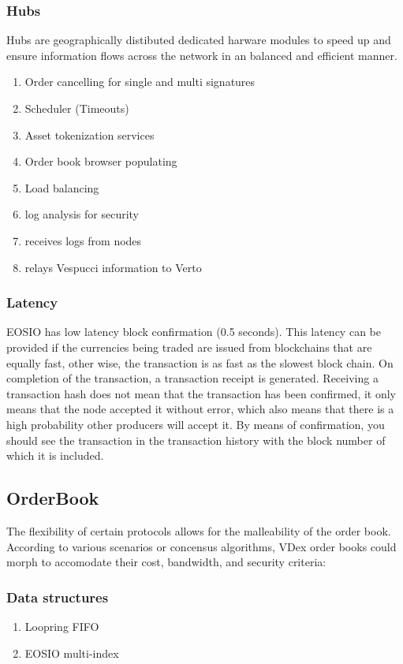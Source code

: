 \documentclass[]{article}
\begin{document}
	\subsubsection{Hubs}
	Hubs are geographically distibuted dedicated harware modules to speed up and ensure  
	information flows across the network in an balanced and efficient manner. 
	\begin{enumerate}
		\item Order cancelling for single and multi signatures 
		\item Scheduler (Timeouts)
		\item Asset tokenization services
		\item Order book browser populating
		\item Load balancing
		\item log analysis for security
		\item receives logs from nodes
		\item relays Vespucci information to Verto
	\end{enumerate}

	\subsubsection{Latency}	
	EOSIO has low latency block confirmation (0.5 seconds).
	This latency can be provided if the currencies being traded are issued from blockchains that are equally fast, other wise, the transaction is as fast as the slowest block chain.
	On completion of the transaction, a transaction receipt is generated. Receiving a transaction hash does not mean that the transaction has been confirmed, it only means that the node accepted it without error, which also means that there is a high probability other producers will accept it. By means of confirmation, you should see the transaction in the transaction history with the block number of which it is included.

\subsection{OrderBook}
The flexibility of certain protocols allows for the malleability of the order book.
According to various scenarios or concensus algorithms, 
VDex order books could morph to accomodate their cost, bandwidth, and security criteria:  
\subsubsection{Data structures}
\begin{enumerate}
\item Loopring FIFO
\item EOSIO multi-index
\end{enumerate}
\end{document}
